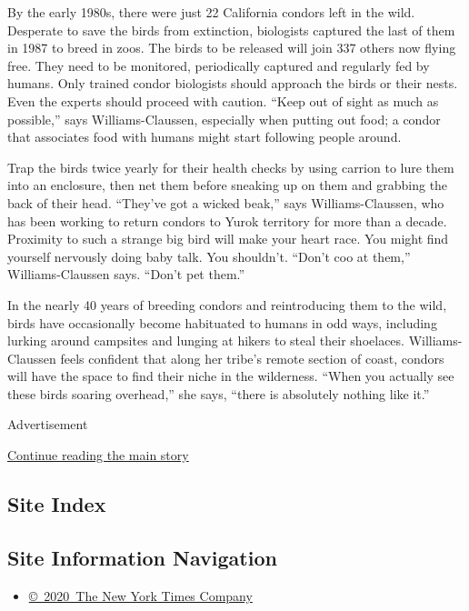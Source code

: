 By the early 1980s, there were just 22 California condors left in the
wild. Desperate to save the birds from extinction, biologists captured
the last of them in 1987 to breed in zoos. The birds to be released will
join 337 others now flying free. They need to be monitored, periodically
captured and regularly fed by humans. Only trained condor biologists
should approach the birds or their nests. Even the experts should
proceed with caution. ``Keep out of sight as much as possible,'' says
Williams-Claussen, especially when putting out food; a condor that
associates food with humans might start following people around.

Trap the birds twice yearly for their health checks by using carrion to
lure them into an enclosure, then net them before sneaking up on them
and grabbing the back of their head. ``They've got a wicked beak,'' says
Williams-Claussen, who has been working to return condors to Yurok
territory for more than a decade. Proximity to such a strange big bird
will make your heart race. You might find yourself nervously doing baby
talk. You shouldn't. ``Don't coo at them,'' Williams-Claussen says.
``Don't pet them.''

In the nearly 40 years of breeding condors and reintroducing them to the
wild, birds have occasionally become habituated to humans in odd ways,
including lurking around campsites and lunging at hikers to steal their
shoelaces. Williams-Claussen feels confident that along her tribe's
remote section of coast, condors will have the space to find their niche
in the wilderness. ``When you actually see these birds soaring
overhead,'' she says, ``there is absolutely nothing like it.''

Advertisement

\protect\hyperlink{after-bottom}{Continue reading the main story}

\hypertarget{site-index}{%
\subsection{Site Index}\label{site-index}}

\hypertarget{site-information-navigation}{%
\subsection{Site Information
Navigation}\label{site-information-navigation}}

\begin{itemize}
\tightlist
\item
  \href{https://help.nytimes3xbfgragh.onion/hc/en-us/articles/115014792127-Copyright-notice}{©~2020~The
  New York Times Company}
\end{itemize}

